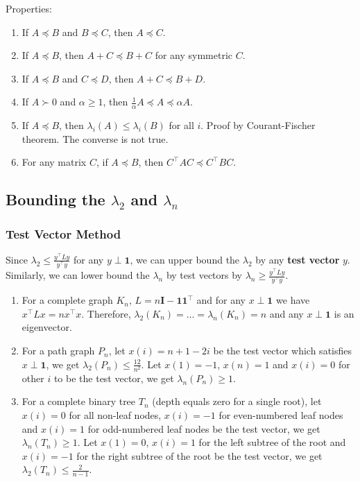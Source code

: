 Properties:
\begin{enumerate}
    \item If $A \preceq B$ and $B \preceq C$, then $A \preceq C$.
    \item If $A \preceq B$, then $A+C \preceq B+C$ for any symmetric $C$.
    \item If $A \preceq B$ and $C \preceq D$, then $A+C \preceq B+D$.
    \item If $A \succ 0$ and $\alpha \ge 1$, then $\frac{1}{\alpha} A \preceq A \preceq \alpha A$.
    \item If $A \preceq B$, then $\lambda_i(A) \le \lambda_i(B)$ for all $i$. Proof by Courant-Fischer theorem. The converse is not true.
    \item For any matrix $C$, if $A \preceq B$, then $C^\top A C \preceq C^\top B C$.
\end{enumerate}

\subsection{Bounding the $\lambda_2$ and $\lambda_n$}

\subsubsection{Test Vector Method}
Since $\lambda_2 \le \frac{y^\top L y}{y^\top y}$ for any $y \perp \boldsymbol{1}$, we can upper bound the $\lambda_2$ by any \textbf{test vector} $y$. Similarly, we can lower bound the $\lambda_n$ by test vectors by $\lambda_n \ge \frac{y^\top L y}{y^\top y}$.

\begin{enumerate}
    \item For a complete graph $K_n$, $L = n \boldsymbol{I} - \boldsymbol{1}\boldsymbol{1}^\top$ and for any $x \perp \boldsymbol{1}$ we have $x^\top L x = n x^\top x$. Therefore, $\lambda_2(K_n) = \dots = \lambda_n(K_n) = n$ and any $x \perp \boldsymbol{1}$ is an eigenvector.
    \item For a path graph $P_n$, let $x(i) = n+1 - 2i$ be the test vector which satisfies $x \perp \boldsymbol{1}$, we get $\lambda_2(P_n) \le \frac{12}{n^2}$. Let $x(1)=-1$, $x(n)=1$ and $x(i)=0$ for other $i$ to be the test vector, we get $\lambda_n(P_n) \ge 1$.
    \item For a complete binary tree $T_n$ (depth equals zero for a single root), let $x(i)=0$ for all non-leaf nodes, $x(i)=-1$ for even-numbered leaf nodes and $x(i)=1$ for odd-numbered leaf nodes be the test vector, we get $\lambda_n(T_n) \ge 1$. Let $x(1)=0$, $x(i)=1$ for the left subtree of the root and $x(i)=-1$ for the right subtree of the root be the test vector, we get $\lambda_2(T_n) \le \frac{2}{n-1}$.
\end{enumerate}

